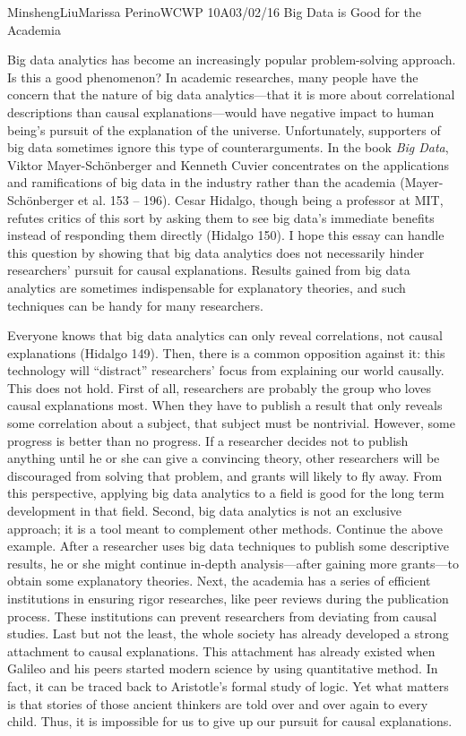 \documentclass[12pt,letterpaper]{article}
\begin{document}
\begin{mla}{Minsheng}{Liu}{Marissa Perino}{WCWP 10A}{03/02/16}
  {Big Data is Good for the Academia}

Big data analytics has become an increasingly popular problem-solving
approach. Is this a good phenomenon? In academic researches, many people
have the concern that the nature of big data analytics---that it is more
about correlational descriptions than causal explanations---would have
negative impact to human being's pursuit of the explanation of the
universe. Unfortunately, supporters of big data sometimes ignore this
type of counterarguments. In the book \emph{Big Data}, Viktor
Mayer-Schönberger and Kenneth Cuvier concentrates on the applications
and ramifications of big data in the industry rather than the academia
(Mayer-Schönberger et al. 153 -- 196). Cesar Hidalgo, though being a
professor at MIT, refutes critics of this sort by asking them to see big
data's immediate benefits instead of responding them directly (Hidalgo
150). I hope this essay can handle this question by showing that big
data analytics does not necessarily hinder researchers' pursuit for
causal explanations. Results gained from big data analytics are
sometimes indispensable for explanatory theories, and such techniques
can be handy for many researchers.

Everyone knows that big data analytics can only reveal correlations, not
causal explanations (Hidalgo 149). Then, there is a common opposition
against it: this technology will ``distract'' researchers' focus from
explaining our world causally. This does not hold. First of all,
researchers are probably the group who loves causal explanations most.
When they have to publish a result that only reveals some correlation
about a subject, that subject must be nontrivial. However, some progress
is better than no progress. If a researcher decides not to publish
anything until he or she can give a convincing theory, other researchers
will be discouraged from solving that problem, and grants will likely to
fly away. From this perspective, applying big data analytics to a field
is good for the long term development in that field. Second, big data
analytics is not an exclusive approach; it is a tool meant to complement
other methods. Continue the above example. After a researcher uses big
data techniques to publish some descriptive results, he or she might
continue in-depth analysis---after gaining more grants---to obtain some
explanatory theories. Next, the academia has a series of efficient
institutions in ensuring rigor researches, like peer reviews during the
publication process. These institutions can prevent researchers from
deviating from causal studies. Last but not the least, the whole society
has already developed a strong attachment to causal explanations. This
attachment has already existed when Galileo and his peers started modern
science by using quantitative method. In fact, it can be traced back to
Aristotle's formal study of logic. Yet what matters is that stories of
those ancient thinkers are told over and over again to every child.
Thus, it is impossible for us to give up our pursuit for causal
explanations.


\end{mla}
\end{document}
